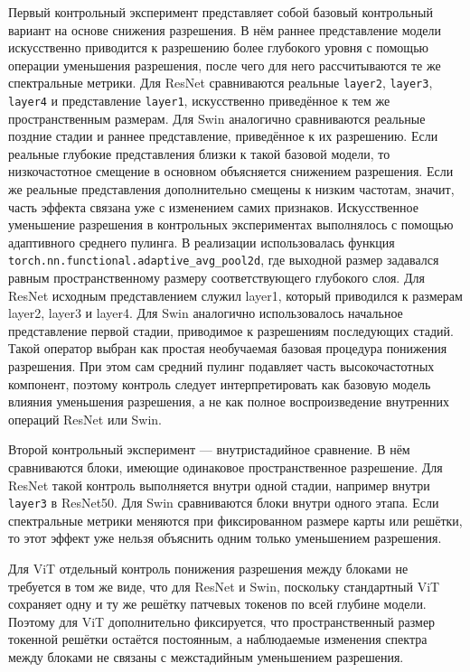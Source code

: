 Первый контрольный эксперимент представляет собой базовый контрольный вариант на основе снижения разрешения. В нём раннее представление модели искусственно приводится к разрешению более глубокого уровня с помощью операции уменьшения разрешения, после чего для него рассчитываются те же спектральные метрики. Для ResNet сравниваются реальные \texttt{layer2}, \texttt{layer3}, \texttt{layer4} и представление \texttt{layer1}, искусственно приведённое к тем же пространственным размерам. Для Swin аналогично сравниваются реальные поздние стадии и раннее представление, приведённое к их разрешению. Если реальные глубокие представления близки к такой базовой модели, то низкочастотное смещение в основном объясняется снижением разрешения. Если же реальные представления дополнительно смещены к низким частотам, значит, часть эффекта связана уже с изменением самих признаков. Искусственное уменьшение разрешения в контрольных экспериментах выполнялось с помощью адаптивного среднего пулинга. В реализации использовалась функция \\ \texttt{torch.nn.functional.adaptive\_avg\_pool2d}, где выходной размер задавался равным пространственному размеру соответствующего глубокого слоя. Для ResNet исходным представлением служил layer1, который приводился к размерам layer2, layer3 и layer4. Для Swin аналогично использовалось начальное представление первой стадии, приводимое к разрешениям последующих стадий. Такой оператор выбран как простая необучаемая базовая процедура понижения разрешения. При этом сам средний пулинг подавляет часть высокочастотных компонент, поэтому контроль следует интерпретировать как базовую модель влияния уменьшения разрешения, а не как полное воспроизведение внутренних операций ResNet или Swin.

Второй контрольный эксперимент — внутристадийное сравнение. В нём сравниваются блоки, имеющие одинаковое пространственное разрешение. Для ResNet такой контроль выполняется внутри одной стадии, например внутри \texttt{layer3} в ResNet50. Для Swin сравниваются блоки внутри одного этапа. Если спектральные метрики меняются при фиксированном размере карты или решётки, то этот эффект уже нельзя объяснить одним только уменьшением разрешения.

Для ViT отдельный контроль понижения разрешения между блоками не требуется в том же виде, что для ResNet и Swin, поскольку стандартный ViT сохраняет одну и ту же решётку патчевых токенов по всей глубине модели. Поэтому для ViT дополнительно фиксируется, что пространственный размер токенной решётки остаётся постоянным, а наблюдаемые изменения спектра между блоками не связаны с межстадийным уменьшением разрешения.
